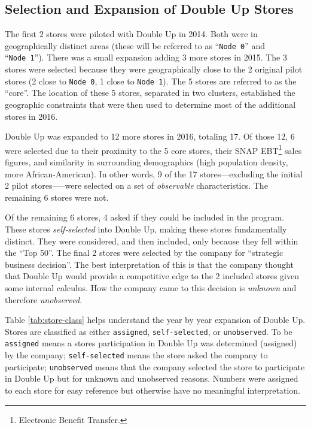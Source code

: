 \documentclass[12pt,letterpaperpaper,]{book}
\begin{document}
\subsection*{Selection and Expansion of Double Up
Stores}\label{selection-and-expansion-of-double-up-stores}

The first 2 stores were piloted with Double Up in 2014. Both were in
geographically distinct areas (these will be referred to as
``\texttt{Node\ 0}'' and ``\texttt{Node\ 1}''). There was a small
expansion adding 3 more stores in 2015. The 3 stores were selected
because they were geographically close to the 2 original pilot stores (2
close to \texttt{Node\ 0}, 1 close to \texttt{Node\ 1}). The 5 stores
are referred to as the ``core''. The location of these 5 stores,
separated in two clusters, established the geographic constraints that
were then used to determine most of the additional stores in 2016.

Double Up was expanded to 12 more stores in 2016, totaling 17. Of those
12, 6 were selected due to their proximity to the 5 core stores, their
SNAP EBT\footnote{Electronic Benefit Transfer.} sales figures, and
similarity in surrounding demographics (high population density, more
African-American). In other words, 9 of the 17 stores---excluding the
initial 2 pilot stores-----were selected on a set of \emph{observable}
characteristics. The remaining 6 stores were not.

Of the remaining 6 stores, 4 asked if they could be included in the
program. These stores \emph{self-selected} into Double Up, making these
stores fundamentally distinct. They were considered, and then included,
only because they fell within the ``Top 50''. The final 2 stores were
selected by the company for ``strategic business decision''. The best
interpretation of this is that the company thought that Double Up would
provide a competitive edge to the 2 included stores given some internal
calculus. How the company came to this decision is \emph{unknown} and
therefore \emph{unobserved}.

Table \ref{tab:store-class} helps understand the year by year expansion
of Double Up. Stores are classified as either \texttt{assigned},
\texttt{self-selected}, or \texttt{unobserved}. To be \texttt{assigned}
means a stores participation in Double Up was determined (assigned) by
the company; \texttt{self-selected} means the store asked the company to
participate; \texttt{unobserved} means that the company selected the
store to participate in Double Up but for unknown and unobserved
reasons. Numbers were assigned to each store for easy reference but
otherwise have no meaningful interpretation.
\end{document}

